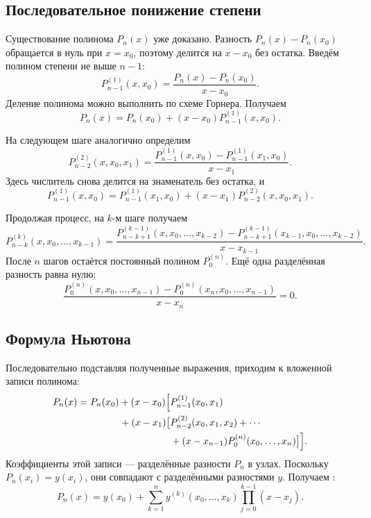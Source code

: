 \documentclass[../final.tex]{subfiles}
\begin{document}
\subsection{Последовательное понижение степени}

Существование полинома $P_n(x)$ уже доказано. Разность
$P_n(x)-P_n(x_0)$ обращается в нуль при $x=x_0$, поэтому делится
на $x-x_0$ без остатка. Введём полином степени не выше $n-1$:
%
\begin{equation*}
    P_{n-1}^{(1)}(x,x_0)=\frac{P_n(x)-P_n(x_0)}{x-x_0}.
\end{equation*}
%
Деление полинома можно выполнить по схеме Горнера. Получаем
%
\begin{equation*}
    P_n(x)=P_n(x_0)+(x-x_0)P_{n-1}^{(1)}(x,x_0).
\end{equation*}

На следующем шаге аналогично определим
%
\begin{equation*}
    P_{n-2}^{(2)}(x,x_0,x_1)
    =\frac{P_{n-1}^{(1)}(x,x_0)-P_{n-1}^{(1)}(x_1,x_0)}{x-x_1}.
\end{equation*}
%
Здесь числитель снова делится на знаменатель без остатка, и
%
\begin{equation*}
    P_{n-1}^{(1)}(x,x_0)
    =P_{n-1}^{(1)}(x_1,x_0)+(x-x_1)P_{n-2}^{(2)}(x,x_0,x_1).
\end{equation*}

Продолжая процесс, на $k$-м шаге получаем
%
\begin{equation*}
    P_{n-k}^{(k)}(x,x_0,\ldots,x_{k-1})
    =\frac{
    P_{n-k+1}^{(k-1)}(x,x_0,\ldots,x_{k-2})
    -P_{n-k+1}^{(k-1)}(x_{k-1},x_0,\ldots,x_{k-2})
    }{x-x_{k-1}}.
\end{equation*}
%
После $n$ шагов остаётся постоянный полином $P_0^{(n)}$.
Ещё одна разделённая разность равна нулю:
%
\begin{equation*}
    \frac{P_0^{(n)}(x,x_0,\ldots,x_{n-1})
    -P_0^{(n)}(x_n,x_0,\ldots,x_{n-1})}{x-x_n}=0.
\end{equation*}

\subsection{Формула Ньютона}

Последовательно подставляя полученные выражения, приходим к вложенной
записи полинома:
%
\begin{equation*}
    \begin{aligned}
    P_n(x)=P_n(x_0)+(x-x_0)\Bigl[&P_{n-1}^{(1)}(x_0,x_1)\\
    {}+(x-x_1)\bigl[&P_{n-2}^{(2)}(x_0,x_1,x_2)+\cdots\\
    &{}+(x-x_{n-1})P_0^{(n)}(x_0,\ldots,x_n)\bigr]\Bigr].
    \end{aligned}
\end{equation*}
%
Коэффициенты этой записи --- разделённые разности $P_n$ в узлах.
Поскольку $P_n(x_i)=y(x_i)$, они совпадают с разделёнными разностями $y$.
Получаем :
%
\begin{equation}
    P_n(x)=y(x_0)+\sum_{k=1}^{n}
    y^{(k)}(x_0,\ldots,x_k)\prod_{j=0}^{k-1}(x-x_j).
    \label{eq:ovf_newton_interpolation}
\end{equation}
\end{document}
